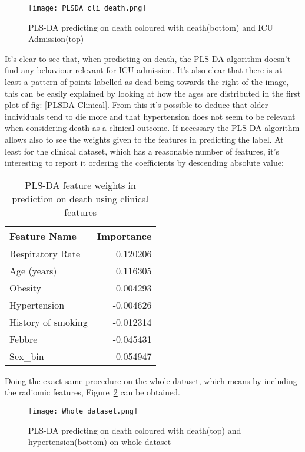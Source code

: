 \begin{figure}[htbp]
  		\texttt{[image: PLSDA\_cli\_death.png]}
          \caption{PLS-DA predicting on death coloured with death(bottom) and ICU Admission(top)\label{PLSDA-Clinical-death}}
\end{figure}

It's clear to see that, when predicting on death, the PLS-DA algorithm doesn't find any behaviour relevant for ICU admission.
It's also clear that there is at least a pattern of points labelled as dead being towards the right of the image, this can be easily explained by looking at how the ages are distributed in the first plot of fig: \ref{PLSDA-Clinical}. 
From this it's possible to deduce that older individuals tend to die more and that hypertension does not seem to be relevant when considering death as a clinical outcome.
If necessary the PLS-DA algorithm allows also to see the weights given to the features in predicting the label. At least for the clinical dataset, which has a reasonable number of features, it's interesting to report it ordering the coefficients by descending absolute value: 

\begin{table}
\caption{PLS-DA feature weights in prediction on death using clinical features}
\centering
	\begin{tabular}{|l|r|}
	\hline
	Feature Name &         Importance \\
	\hline
	 Respiratory Rate &  0.120206 \\
	 Age (years) &  0.116305 \\
	 Obesity &  0.004293 \\
	 Hypertension & -0.004626 \\
	 History of smoking & -0.012314 \\
	 Febbre & -0.045431 \\
	 Sex\_bin & -0.054947 \\
	\hline
	\end{tabular}
\end{table}

Doing the exact same procedure on the whole dataset, which means by including the radiomic features, Figure~\ref{fig:whole_dataset} can be obtained.

\begin{figure}[htbp]
  		\texttt{[image: Whole\_dataset.png]}
          \caption{PLS-DA predicting on death coloured with death(top) and hypertension(bottom) on whole dataset\label{fig:whole_dataset}}
\end{figure}



